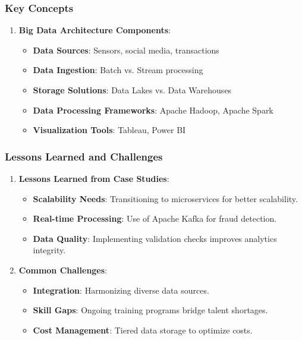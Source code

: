 \documentclass[aspectratio=169]{beamer}
\begin{document}
\begin{frame}[fragile]
    \frametitle{Key Concepts}
    \begin{enumerate}
        \item \textbf{Big Data Architecture Components}:
        \begin{itemize}
            \item \textbf{Data Sources}: Sensors, social media, transactions
            \item \textbf{Data Ingestion}: Batch vs. Stream processing
            \item \textbf{Storage Solutions}: Data Lakes vs. Data Warehouses
            \item \textbf{Data Processing Frameworks}: Apache Hadoop, Apache Spark
            \item \textbf{Visualization Tools}: Tableau, Power BI
        \end{itemize}
    \end{enumerate}
\end{frame}

\begin{frame}[fragile]
    \frametitle{Lessons Learned and Challenges}
    \begin{enumerate}
        \item \textbf{Lessons Learned from Case Studies}:
        \begin{itemize}
            \item \textbf{Scalability Needs}: Transitioning to microservices for better scalability.
            \item \textbf{Real-time Processing}: Use of Apache Kafka for fraud detection.
            \item \textbf{Data Quality}: Implementing validation checks improves analytics integrity.
        \end{itemize}
        \item \textbf{Common Challenges}:
        \begin{itemize}
            \item \textbf{Integration}: Harmonizing diverse data sources.
            \item \textbf{Skill Gaps}: Ongoing training programs bridge talent shortages.
            \item \textbf{Cost Management}: Tiered data storage to optimize costs.
        \end{itemize}
    \end{enumerate}
\end{frame}
\end{document}
